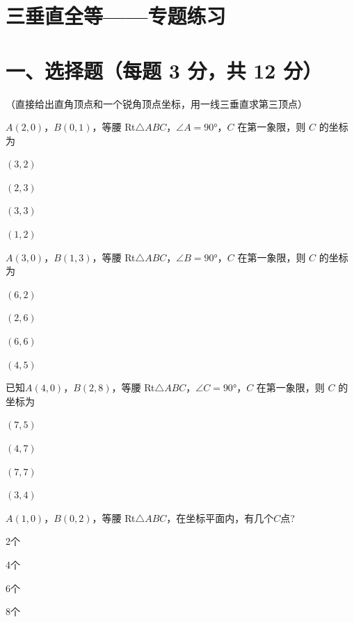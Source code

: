 \documentclass{exam-zh}
\begin{document}
\section*{三垂直全等——专题练习}

\section*{一、选择题（每题 3 分，共 12 分）}
（直接给出直角顶点和一个锐角顶点坐标，用一线三垂直求第三顶点）


\begin{question}[points=3]
  $A(2, 0)$，$B(0, 1)$，等腰 Rt$\triangle ABC$，$\angle A = 90°$，$C$ 在第一象限，则 $C$ 的坐标为
  \begin{choices}
    \item $(3, 2)$
    \item $(2, 3)$
    \item $(3, 3)$
    \item $(1, 2)$
  \end{choices}
\end{question}



\begin{question}[points=3]
  $A(3, 0)$，$B(1, 3)$，等腰 Rt$\triangle ABC$，$\angle B = 90°$，$C$ 在第一象限，则 $C$ 的坐标为
  \begin{choices}
    \item $(6, 2)$
    \item $(2, 6)$
    \item $(6, 6)$
    \item $(4, 5)$
  \end{choices}
\end{question}



\begin{question}[points=3]
  已知$A(4, 0)$，$B(2, 8)$，等腰 Rt$\triangle ABC$，$\angle C = 90°$，$C$ 在第一象限，则 $C$ 的坐标为
  \begin{choices}
    \item $(7, 5)$
    \item $(4, 7)$
    \item $(7, 7)$
    \item $(3, 4)$
  \end{choices}
\end{question}



\begin{question}[points=3]
  $A(1, 0)$，$B(0, 2)$，等腰 Rt$\triangle ABC$，在坐标平面内，有几个$C$点?
  \begin{choices}
    \item 2个
    \item 4个
    \item 6个
    \item 8个
  \end{choices}
\end{question}
\end{document}

